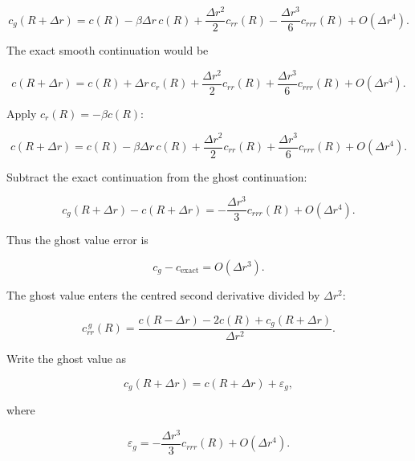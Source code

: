 \documentclass[11pt,a4paper]{article}
\begin{document}
\begin{equation}
c_g(R+\Delta r)
=
c(R)
-
\beta\Delta r\,c(R)
+
\frac{\Delta r^2}{2}c_{rr}(R)
-
\frac{\Delta r^3}{6}c_{rrr}(R)
+
O(\Delta r^4).
\tag{TRISO-DIS-457}
\label{eq:triso-dis-457}
\end{equation}

The exact smooth continuation would be

\begin{equation}
c(R+\Delta r)
=
c(R)
+
\Delta r\,c_r(R)
+
\frac{\Delta r^2}{2}c_{rr}(R)
+
\frac{\Delta r^3}{6}c_{rrr}(R)
+
O(\Delta r^4).
\tag{TRISO-DIS-458}
\label{eq:triso-dis-458}
\end{equation}

Apply $c_r(R)=-\beta c(R)$:

\begin{equation}
c(R+\Delta r)
=
c(R)
-
\beta\Delta r\,c(R)
+
\frac{\Delta r^2}{2}c_{rr}(R)
+
\frac{\Delta r^3}{6}c_{rrr}(R)
+
O(\Delta r^4).
\tag{TRISO-DIS-459}
\label{eq:triso-dis-459}
\end{equation}

Subtract the exact continuation from the ghost continuation:

\begin{equation}
c_g(R+\Delta r)-c(R+\Delta r)
=
-\frac{\Delta r^3}{3}c_{rrr}(R)
+
O(\Delta r^4).
\tag{TRISO-DIS-460}
\label{eq:triso-dis-460}
\end{equation}

Thus the ghost value error is

\begin{equation}
\boxed{
c_g-c_{\mathrm{exact}}
=
O(\Delta r^3).
}
\tag{TRISO-DIS-461}
\label{eq:triso-dis-461}
\end{equation}

The ghost value enters the centred second derivative divided by $\Delta r^2$:

\begin{equation}
c_{rr}^{\,g}(R)
=
\frac{
c(R-\Delta r)-2c(R)+c_g(R+\Delta r)
}{
\Delta r^2
}.
\tag{TRISO-DIS-462}
\label{eq:triso-dis-462}
\end{equation}

Write the ghost value as

\begin{equation}
c_g(R+\Delta r)
=
c(R+\Delta r)
+
\varepsilon_g,
\tag{TRISO-DIS-463}
\label{eq:triso-dis-463}
\end{equation}

where

\begin{equation}
\varepsilon_g
=
-\frac{\Delta r^3}{3}c_{rrr}(R)
+
O(\Delta r^4).
\tag{TRISO-DIS-464}
\label{eq:triso-dis-464}
\end{equation}
\end{document}
